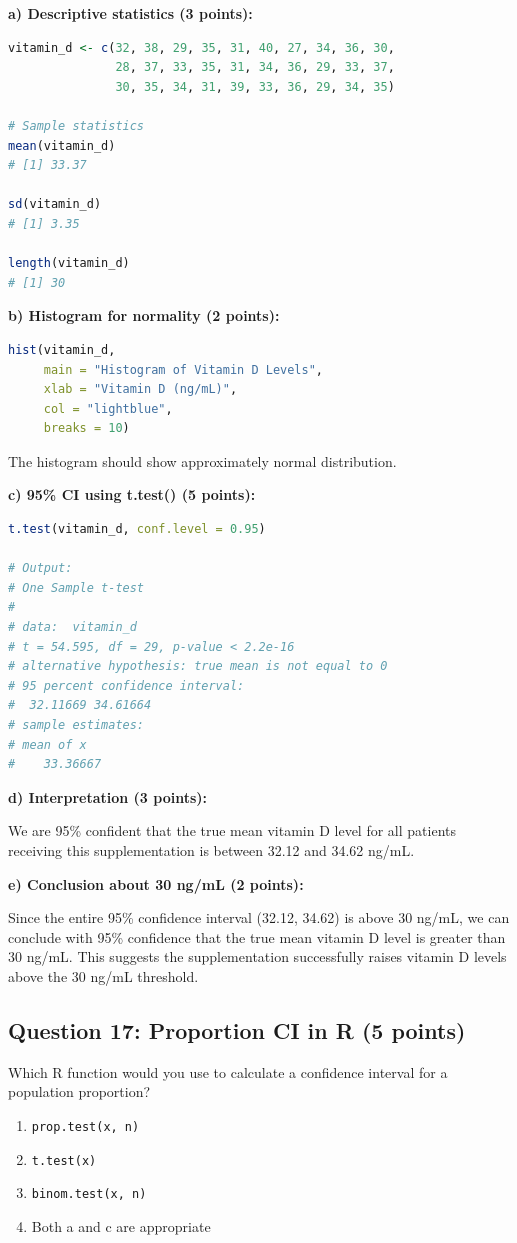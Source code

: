 \documentclass[11pt]{article}
\begin{document}
\textbf{a) Descriptive statistics (3 points):}
\begin{lstlisting}[language=R, basicstyle=\small\ttfamily]
vitamin_d <- c(32, 38, 29, 35, 31, 40, 27, 34, 36, 30,
               28, 37, 33, 35, 31, 34, 36, 29, 33, 37,
               30, 35, 34, 31, 39, 33, 36, 29, 34, 35)

# Sample statistics
mean(vitamin_d)
# [1] 33.37

sd(vitamin_d)
# [1] 3.35

length(vitamin_d)
# [1] 30
\end{lstlisting}

\textbf{b) Histogram for normality (2 points):}
\begin{lstlisting}[language=R, basicstyle=\small\ttfamily]
hist(vitamin_d,
     main = "Histogram of Vitamin D Levels",
     xlab = "Vitamin D (ng/mL)",
     col = "lightblue",
     breaks = 10)
\end{lstlisting}
The histogram should show approximately normal distribution.

\textbf{c) 95\% CI using t.test() (5 points):}
\begin{lstlisting}[language=R, basicstyle=\small\ttfamily]
t.test(vitamin_d, conf.level = 0.95)

# Output:
# One Sample t-test
#
# data:  vitamin_d
# t = 54.595, df = 29, p-value < 2.2e-16
# alternative hypothesis: true mean is not equal to 0
# 95 percent confidence interval:
#  32.11669 34.61664
# sample estimates:
# mean of x
#    33.36667
\end{lstlisting}

\textbf{d) Interpretation (3 points):}

We are 95\% confident that the true mean vitamin D level for all patients receiving this supplementation is between 32.12 and 34.62 ng/mL.

\textbf{e) Conclusion about 30 ng/mL (2 points):}

Since the entire 95\% confidence interval (32.12, 34.62) is above 30 ng/mL, we can conclude with 95\% confidence that the true mean vitamin D level is greater than 30 ng/mL. This suggests the supplementation successfully raises vitamin D levels above the 30 ng/mL threshold.

\subsection*{Question 17: Proportion CI in R (5 points)}

Which R function would you use to calculate a confidence interval for a population proportion?

\begin{enumerate}[label=\alph*)]
\item \texttt{prop.test(x, n)}
\item \texttt{t.test(x)}
\item \texttt{binom.test(x, n)}
\item Both a and c are appropriate
\end{enumerate}
\end{document}
